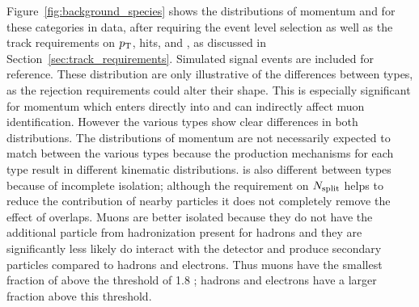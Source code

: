 Figure~\ref{fig:background_species} shows the distributions of momentum and \dedx for these categories in data, after requiring the event level selection as well as the track requirements on $p_{\mathrm{T}}$, hits, and \Nsplit, as discussed in Section~\ref{sec:track_requirements}.
Simulated signal events are included for reference.
These distribution are only illustrative of the differences between types, as the rejection requirements could alter their shape. 
This is especially significant for momentum which enters directly into \ep and can indirectly affect muon identification.
However the various types show clear differences in both distributions.
The distributions of momentum are not necessarily expected to match between the various types because the production mechanisms for each type result in different kinematic distributions.
\dedx is also different between types because of incomplete isolation; although the requirement on $N_{\mathrm{split}}$ helps to reduce the contribution of nearby particles it does not completely remove the effect of overlaps.
Muons are better isolated because they do not have the additional particle from hadronization present for hadrons and they are significantly less likely do interact with the detector and produce secondary particles compared to hadrons and electrons.
Thus muons have the smallest fraction of \dedx above the threshold of 1.8 \MeVgcm; hadrons and electrons have a larger fraction above this threshold.

